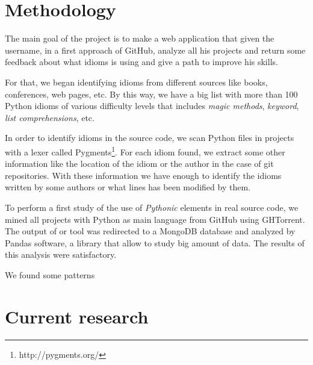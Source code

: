 \documentclass[conference]{IEEEtran}
\begin{document}
\section{Methodology}

The main goal of the project is to make a web application that given the username, in a first approach of GitHub, analyze all his projects and return some feedback about what idioms is using and give a path to improve his skills.

For that, we began identifying idioms from different sources like books, conferences, web pages, etc. By this way, we have a big list with more than 100 Python idioms of various difficulty levels that includes \textit{magic methods}, \textit{keyword}, \textit{list comprehensions}, etc.

In order to identify idioms in the source code, we scan Python files in projects with a lexer called Pygments\footnote{http://pygments.org/}. For each idiom found, we extract some other information like the location of the idiom or the author in the case of git repositories. With these information we have enough to identify the idioms written by some authors or what lines has been modified by them.

To perform a first study of the use of \emph{Pythonic} elements in real source code, we mined all projects with Python as main language from GitHub using GHTorrent. The output of or tool was redirected to a MongoDB database and analyzed by Pandas software, a library that allow to study big amount of data. The results of this analysis were satisfactory.

We found some patterns 

\section{Current research}
\end{document}
